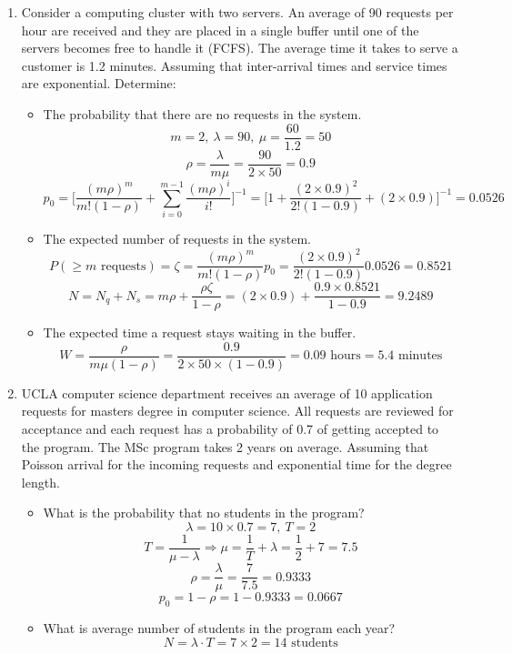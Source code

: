\documentclass[10.5pt,letterpaper]{article}
\begin{document}
\begin{enumerate}[label=\textbf{Problem \arabic*.}]
\begin{itemize}
	\end{itemize}
\item Consider a computing cluster with two servers. An average of 90 requests per hour are received and they are placed in a single buffer until one of the servers becomes free to handle it (FCFS). The average time it takes to serve a customer is 1.2 minutes. Assuming that inter-arrival times and service times are exponential. Determine:
	\begin{itemize}
	\item The probability that there are no requests in the system.
	\[m=2,\ \lambda = 90,\ \mu=\frac{60}{1.2}=50\]
	\[\rho = \frac{\lambda}{m\mu} = \frac{90}{2\times50} = 0.9\]
	\[\boxed{p_0 = \bigg[\frac{(m\rho)^m}{m!(1-\rho)}+\sum_{i=0}^{m-1}\frac{(m\rho)^i}{i!}\bigg]^{-1} = \bigg[1+\frac{(2\times0.9)^2}{2!(1-0.9)}+(2\times0.9)\bigg]^{-1} = 0.0526}\]
	\item The expected number of requests in the system.
	\[P(\geq m \text{ requests}) = \zeta = \frac{(m\rho)^m}{m!(1-\rho)}p_0 = \frac{(2\times0.9)^2}{2!(1-0.9)}0.0526 = 0.8521\]
	\[\boxed{N = N_q + N_s = m\rho + \frac{\rho\zeta}{1-\rho} = (2\times0.9)+\frac{0.9\times0.8521}{1-0.9} = 9.2489}\]
	\item The expected time a request stays waiting in the buffer.
	\[\boxed{W = \frac{\rho}{m\mu(1-\rho)} = \frac{0.9}{2\times50\times(1-0.9)} = 0.09 \text{ hours} = 5.4 \text{ minutes}}\]
	\end{itemize}
\item UCLA computer science department receives an average of 10 application requests for masters degree in computer science. All requests are reviewed for acceptance and each request has a probability of 0.7 of getting accepted to the program. The MSc program takes 2 years on average. Assuming that Poisson arrival for the incoming requests and exponential time for the degree length.
	\begin{itemize}
	\item What is the probability that no students in the program?
	\[\lambda = 10\times0.7 = 7, \ T = 2\]
	\[T = \frac{1}{\mu-\lambda} \Rightarrow \mu = \frac{1}{T} + \lambda = \frac{1}{2} + 7 = 7.5\]
	\[\rho = \frac{\lambda}{\mu} = \frac{7}{7.5} = 0.9333\]
	\[\boxed{p_0 = 1-\rho = 1-0.9333 = 0.0667}\]
	\item What is average number of students in the program each year?
	\[\boxed{N = \lambda \cdot T = 7 \times 2 = 14 \text{ students}}\]
	\end{itemize}
\end{enumerate}
\end{document}
